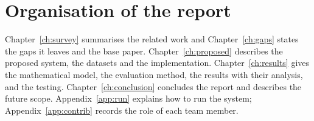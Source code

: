 \section{Organisation of the report}\label{sec:organisation}
Chapter~\ref{ch:survey} summarises the related work and Chapter~\ref{ch:gaps} states the gaps it
leaves and the base paper. Chapter~\ref{ch:proposed} describes the proposed system, the datasets and
the implementation. Chapter~\ref{ch:results} gives the mathematical model, the evaluation method, the
results with their analysis, and the testing. Chapter~\ref{ch:conclusion} concludes the report and
describes the future scope. Appendix~\ref{app:run} explains how to run the system;
Appendix~\ref{app:contrib} records the role of each team member.
